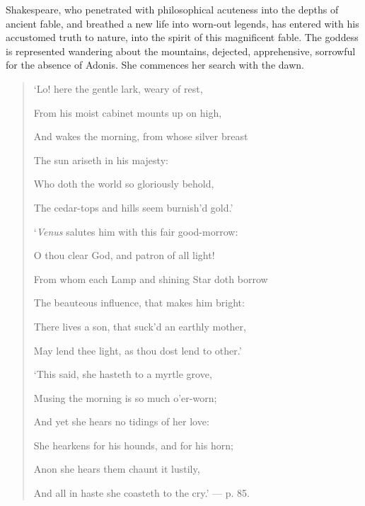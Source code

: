 \documentclass[a4paper, 11pt, oneside, polutonikogreek, english]{article}
\begin{document}
Shakespeare, who penetrated with philosophical acuteness into the depths of ancient fable, and breathed a new life into worn-out legends, has entered with his accustomed truth to nature, into the spirit of this magnificent fable. The goddess is represented wandering about the mountains, dejected, apprehensive, sorrowful for the absence of Adonis. She commences her search with the dawn.
\begin{quotation}
`Lo! here the gentle lark, weary of rest,

From his moist cabinet mounts up on high,

And wakes the morning, from whose silver breast

The sun ariseth in his majesty:

\hspace*{15mm}Who doth the world so gloriously behold,

\hspace*{15mm}The cedar-tops and hills seem burnish'd gold.'

\bigskip

`\emph{Venus} salutes him with this fair good-morrow:

O thou clear God, and patron of all light!

From whom each Lamp and shining Star doth borrow

The beauteous influence, that makes him bright:

\hspace*{15mm}There lives a son, that suck'd an earthly mother,

\hspace*{15mm}May lend thee light, as thou dost lend to other.'

\bigskip

`This said, she hasteth to a myrtle grove,

Musing the morning is so much o'er-worn;

And yet she hears no tidings of her love:

She hearkens for his hounds, and for his horn;

\hspace*{15mm}Anon she hears them chaunt it lustily,

\hspace*{15mm}And all in haste she coasteth to the cry.' --- p. 85.
\end{quotation}
\end{document}
